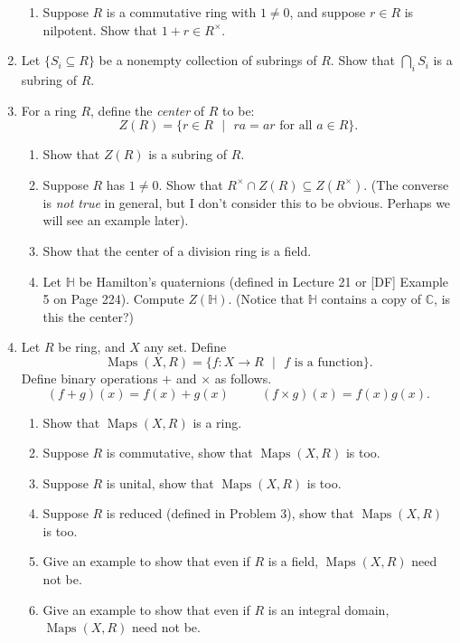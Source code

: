 \documentclass[11pt]{article}
\newcommand{\maps}{\operatorname{Maps}}
\newcommand{\bC}{\mathbb{C}}
\newcommand{\bH}{\mathbb{H}}
\begin{document}
\begin{enumerate}
{\begin{enumerate}
{    }
    \item{
    Suppose $R$ is a commutative ring with $1\not=0$, and suppose $r\in R$ is nilpotent.  Show that $1+r\in R^\times$.
    }
  \end{enumerate}
  }
  \item{
  Let $\{S_i\subseteq R\}$ be a nonempty collection of subrings of $R$.  Show that $\bigcap_i S_i$ is a subring of $R$.
  }
  \item{
  For a ring $R$, define the \textit{center} of $R$ to be:
  \[Z(R) = \{r\in R\text{ }|\text{ }ra = ar\text{ for all }a\in R\}.\]
  \begin{enumerate}
    \item{
    Show that $Z(R)$ is a subring of $R$.
    }
    \item{
    Suppose $R$ has $1\not=0$.  Show that $R^\times\cap Z(R)\subseteq Z(R^\times)$.  (The converse is \textit{not true} in general, but I don't consider this to be obvious.  Perhaps we will see an example later).
    }
    \item{
    Show that the center of a division ring is a field.
    }
    \item{
    Let $\bH$ be Hamilton's quaternions (defined in Lecture 21 or [DF] Example 5 on Page 224).  Compute $Z(\bH)$.  (Notice that $\bH$ contains a copy of $\bC$, is this the center?)
    }
  \end{enumerate}
  }
  \item{
  Let $R$ be ring, and $X$ any set.  Define
  \[\maps(X,R) = \{f:X\to R\text{ }|\text{ }f\text{ is a function}\}.\]
  Define binary operations $+$ and $\times$ as follows.
  \[(f+g)(x) = f(x) + g(x)\hspace{30pt}(f\times g)(x) = f(x)g(x).\]
  \begin{enumerate}
    \item{
    Show that $\maps(X,R)$ is a ring.
    }
    \item{
    Suppose $R$ is commutative, show that $\maps(X,R)$ is too.
    }
    \item{
    Suppose $R$ is unital, show that $\maps(X,R)$ is too.
    }
    \item{
    Suppose $R$ is reduced (defined in Problem 3), show that $\maps(X,R)$ is too.
    }
    \item{
    Give an example to show that even if $R$ is a field, $\maps(X,R)$ need not be.
    }
    \item{
    Give an example to show that even if $R$ is an integral domain, $\maps(X,R)$ need not be.
    }
  \end{enumerate}
}
\end{enumerate}
\end{document}
